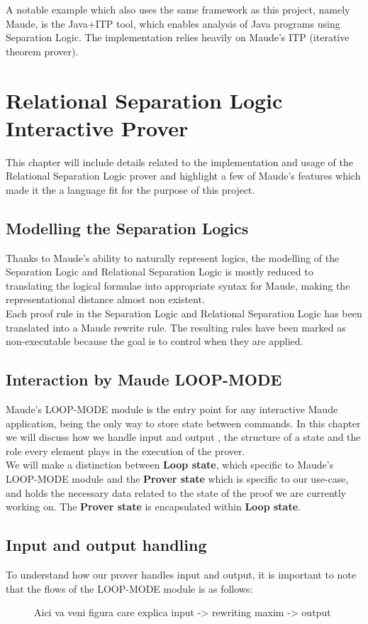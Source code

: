 \documentclass[12pt,a4paper]{article}
\begin{document}
A notable example which also uses the same framework as this project, namely Maude, is the Java+ITP\cite{JAVAITP} tool, which enables analysis of Java programs using Separation Logic. The implementation relies heavily on Maude's ITP (iterative theorem prover).

\section{Relational Separation Logic Interactive Prover} 
This chapter will include details related to the implementation and usage of the Relational Separation Logic prover and highlight a few of Maude's features which made it the a language fit for the purpose of this project.
\subsection{Modelling the Separation Logics}
Thanks to Maude's ability to naturally represent logics, the modelling of the Separation Logic and Relational Separation Logic is mostly reduced to translating the logical formulae into appropriate syntax for Maude, making the representational distance \cite{maudeprimer} almost non existent. \\

Each proof rule in the Separation Logic and Relational Separation Logic has been translated into a Maude rewrite rule. The resulting rules have been marked as non-executable because the goal is to control when they are applied.
\subsection{Interaction by Maude LOOP-MODE}
Maude's LOOP-MODE module is the entry point for any interactive Maude application, being the only way to store state between commands. In this chapter we will discuss how we handle input and output , the structure of a state and the role every element plays in the execution of the prover.\\

We will make a distinction between \textbf{Loop state}, which specific to Maude's LOOP-MODE module and the \textbf{Prover state} which is specific to our use-case, and holds the necessary data related to the state of the proof we are currently working on. The \textbf{Prover state} is encapsulated within \textbf{Loop state}.
\subsection{Input and output handling}
To understand how our prover handles input and output, it is important to note that the flows of the LOOP-MODE module is as follows: 
\begin{figure}
	Aici va veni figura care explica input -> rewriting maxim -> output
\end{figure}
\end{document}
